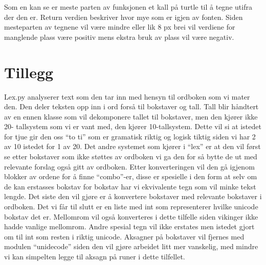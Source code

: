 \documentclass[11pt]{article}
\begin{document}
    Som en kan se er meste parten av funksjonen et kall på turtle til å
tegne utifra der den er. Return verdien beskriver hvor mye som er igjen
av fonten. Siden mesteparten av tegnene vil være mindre eller lik 8 px
brei vil verdiene for manglende plass være positiv mens ekstra bruk av
plass vil være negativ.

    \hypertarget{tillegg}{%
\section{Tillegg}\label{tillegg}}

Lex.py analyserer text som den tar inn med hensyn til ordboken som vi
mater den. Den deler teksten opp inn i ord forså til bokstaver og tall.
Tall blir håndtert av en ennen klasse som vil dekomponere tallet til
bokstaver, men den kjører ikke 20- tallsystem som vi er vant med, den
kjører 10-tallsystem. Dette vil si at istedet for tjue gir den oss ``to
ti'' som er gramatisk riktig og logisk tiktig siden vi har 2 av 10
istedet for 1 av 20. Det andre systemet som kjører i ``lex'' er at den
vil først se etter bokstaver som ikke støttes av ordboken vi ga den for
så bytte de ut med relevante forslag også gitt av ordboken. Etter
konverteringen vil den gå igjenom blokker av ordene for å finne
``combo''-er, disse er spesielle i den form at selv om de kan erstasses
bokstav for bokstav har vi ekvivalente tegn som vil minke tekst lengde.
Det siste den vil gjøre er å konvertere bokstaver med relevante
bokstaver i ordboken. Det vi får til slutt er en liste med int som
representerer hvilke unicode bokstav det er. Mellomrom vil også
konverteres i dette tilfelle siden vikinger ikke hadde vanlige
mellomrom. Andre spesial tegn vil ikke erstates men istedet gjort om til
int som resten i riktig unicode. Aksagner på bokstaver vil fjernes med
modulen ``unidecode'' siden den vil gjøre arbeidet litt mer vanskelig,
med mindre vi kan simpelten legge til aksagn på runer i dette tilfellet.


    
    
    
    
\end{document}
